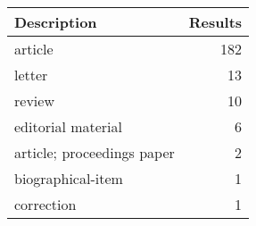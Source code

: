
\begin{tabular}{lr}
\toprule
Description & Results\\
\midrule
article & 182\\
letter & 13\\
review & 10\\
editorial material & 6\\
article; proceedings paper & 2\\
\addlinespace
biographical-item & 1\\
correction & 1\\
\bottomrule
\end{tabular}